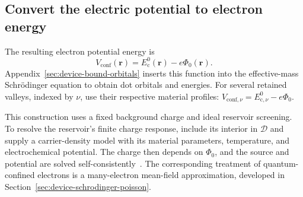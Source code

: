 \subsection{Convert the electric potential to electron energy}
The resulting electron potential energy is
\begin{equation}
 V_{\mathrm{conf}}(\mathbf r)
       =E_{\mathrm c}^{0}(\mathbf r)-e\Phi_0(\mathbf r).
 \label{eq:device-confinement-energy}
\end{equation}
Appendix~\ref{sec:device-bound-orbitals} inserts this function into the
effective-mass Schr\"odinger equation to obtain dot orbitals and energies.
For several retained valleys, indexed by $\nu$, use their
respective material profiles:
$V_{\mathrm{conf},\nu}=E_{\mathrm c,\nu}^{0}-e\Phi_0$.

This construction uses a fixed background charge and ideal
reservoir screening. To resolve the reservoir's finite charge
response, include its interior in $\mathcal D$ and supply a
carrier-density model with its material parameters, temperature,
and electrochemical potential. The charge then depends on
$\Phi_0$, and the source and potential are solved
self-consistently~\cite{QTCADPoisson}. The corresponding treatment
of quantum-confined electrons is a many-electron mean-field
approximation, developed in
Section~\ref{sec:device-schrodinger-poisson}.
